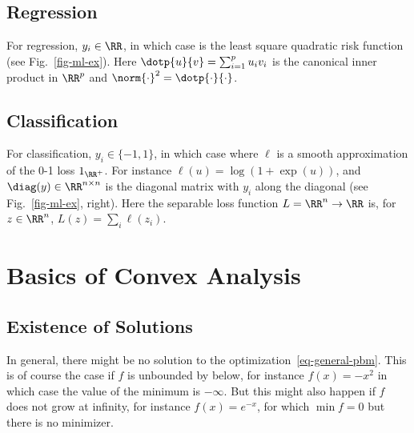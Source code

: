 \subsection{Regression}

For regression, $y_i \in \RR$, in which case
is the least square quadratic risk function (see Fig.~\ref{fig-ml-ex}).
%
Here $\dotp{u}{v}=\sum_{i=1}^p u_i v_i$ is the canonical inner product in $\RR^p$ and $\norm{\cdot}^2=\dotp{\cdot}{\cdot}$. 


\subsection{Classification}

For classification, $y_i \in \{-1,1\}$, in which case
where $\ell$ is a smooth approximation of the 0-1 loss $1_{\RR^+}$.
%
For instance $\ell(u)=\log(1+\exp(u))$, and $\diag(y) \in \RR^{n \times n}$ is the diagonal matrix with $y_i$ along the diagonal (see Fig.~\ref{fig-ml-ex}, right). Here the separable loss function $L = \RR^n \rightarrow \RR$ is, for $z \in \RR^n$, $L(z)=\sum_i \ell(z_i)$. 


\section{Basics of Convex Analysis}

\subsection{Existence of Solutions}

In general, there might be no solution to the optimization~\eqref{eq-general-pbm}. This is of course the case if $f$ is unbounded by below, for instance $f(x)=-x^2$ in which case the value of the minimum is $-\infty$. But this might also happen if $f$ does not grow at infinity, for instance $f(x)=e^{-x}$, for which $\min f = 0$ but there is no minimizer.

